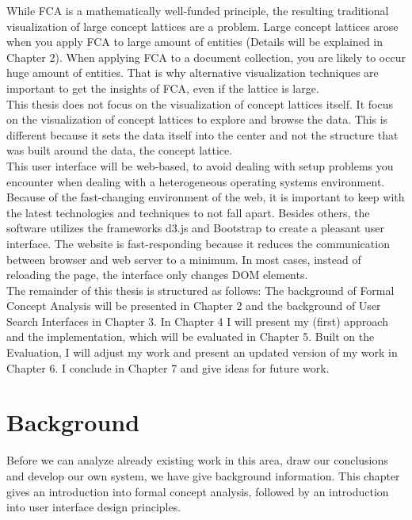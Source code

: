 \documentclass[11pt]{report}
\begin{document}
 While FCA is a mathematically well-funded principle, the resulting traditional visualization of large concept lattices are a problem. Large concept lattices arose when you apply FCA to large amount of entities (Details will be explained in Chapter 2). When applying FCA to a document collection, you are likely to occur huge amount of entities. That is why alternative visualization techniques are important to get the insights of FCA, even if the lattice is large. \\
  
 This thesis does not focus on the visualization of concept lattices itself. It focus on the visualization of concept lattices to explore and browse the data. This is different because it sets the data itself into the center and not the structure that was built around the data, the concept lattice.\\
 
This user interface will be web-based, to avoid dealing with setup problems you encounter when dealing with a heterogeneous operating systems environment. Because of the fast-changing environment of the web, it is important to keep with the latest technologies and techniques to not fall apart. Besides others, the software utilizes the frameworks d3.js and Bootstrap to create a pleasant user interface. The website is fast-responding because it reduces the communication between browser and web server to a minimum. In most cases, instead of reloading the page, the interface only changes DOM elements. \\
    
 The remainder of this thesis is structured as follows: The background of Formal Concept Analysis will be presented in Chapter 2 and the background of User Search Interfaces in Chapter 3. In Chapter 4 I will present my (first) approach and the implementation, which will be evaluated in Chapter 5. Built on the Evaluation, I will adjust my work and present an updated version of my work in Chapter 6. I conclude in Chapter 7 and give ideas for future work.
 
\chapter{Background}

Before we can analyze already existing work in this area, draw our conclusions and develop our own system, we have give background information. This chapter gives an introduction into formal concept analysis, followed by an introduction into user interface design principles.
\end{document}
